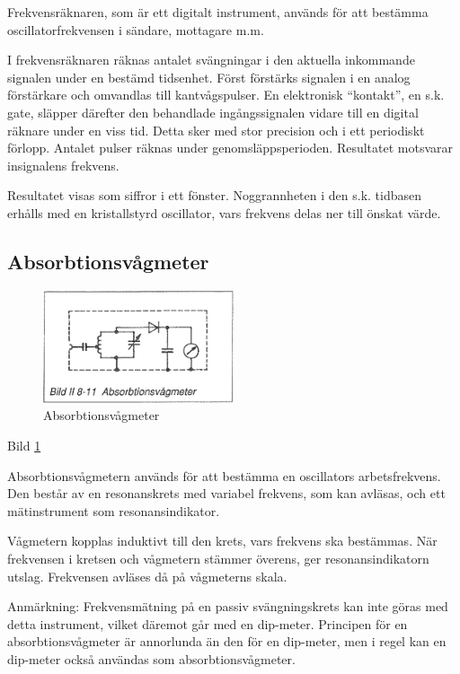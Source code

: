Frekvensräknaren, som är ett digitalt instrument, används för att
bestämma oscillatorfrekvensen i sändare, mottagare m.m.

I frekvensräknaren räknas antalet svängningar i den aktuella
inkommande signalen under en bestämd tidsenhet. Först förstärks
signalen i en analog förstärkare och omvandlas till kantvågspulser. En
elektronisk ``kontakt'', en s.k. gate, släpper därefter den behandlade
ingångssignalen vidare till en digital räknare under en viss
tid. Detta sker med stor precision och i ett periodiskt
förlopp. Antalet pulser räknas under genomsläppsperioden. Resultatet
motsvarar insignalens frekvens.

Resultatet visas som siffror i ett fönster.  Noggrannheten i den
s.k. tidbasen erhålls med en kristallstyrd oscillator, vars frekvens
delas ner till önskat värde.

\begin{rev-raderas}
\subsection{Absorbtionsvågmeter}

\begin{figure}
  \includegraphics[width=0.5\textwidth]{images/bild_2_8-11}
  \caption{Absorbtionsvågmeter}
  \label{fig:bildII8-11}
\end{figure}

Bild \ref{fig:bildII8-11}

Absorbtionsvågmetern används för att bestämma en oscillators
arbetsfrekvens. Den består av en resonanskrets med variabel frekvens,
som kan avläsas, och ett mätinstrument som resonansindikator.

Vågmetern kopplas induktivt till den krets, vars frekvens ska
bestämmas. När frekvensen i kretsen och vågmetern stämmer överens, ger
resonansindikatorn utslag. Frekvensen avläses då på vågmeterns skala.

Anmärkning: Frekvensmätning på en passiv svängningskrets kan inte
göras med detta instrument, vilket däremot går med en
dip-meter. Principen för en absorbtionsvågmeter är annorlunda än den
för en dip-meter, men i regel kan en dip-meter också användas som
absorbtionsvågmeter.
\end{rev-raderas}


